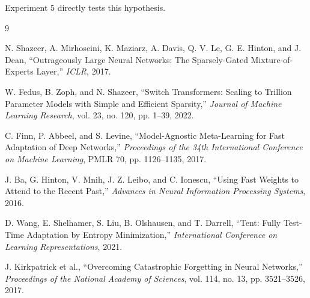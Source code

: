 \documentclass[10pt]{article}
\begin{document}
Experiment 5 directly tests this hypothesis.

\begin{thebibliography}{9}

N. Shazeer, A. Mirhoseini, K. Maziarz, A. Davis, Q. V. Le, G. E. Hinton, and J. Dean,
``Outrageously Large Neural Networks: The Sparsely-Gated Mixture-of-Experts Layer,''
\emph{ICLR}, 2017.

W. Fedus, B. Zoph, and N. Shazeer,
``Switch Transformers: Scaling to Trillion Parameter Models with Simple and Efficient Sparsity,''
\emph{Journal of Machine Learning Research}, vol. 23, no. 120, pp. 1--39, 2022.

C. Finn, P. Abbeel, and S. Levine,
``Model-Agnostic Meta-Learning for Fast Adaptation of Deep Networks,''
\emph{Proceedings of the 34th International Conference on Machine Learning},
PMLR 70, pp. 1126--1135, 2017.

J. Ba, G. Hinton, V. Mnih, J. Z. Leibo, and C. Ionescu,
``Using Fast Weights to Attend to the Recent Past,''
\emph{Advances in Neural Information Processing Systems}, 2016.

D. Wang, E. Shelhamer, S. Liu, B. Olshausen, and T. Darrell,
``Tent: Fully Test-Time Adaptation by Entropy Minimization,''
\emph{International Conference on Learning Representations}, 2021.

J. Kirkpatrick et al.,
``Overcoming Catastrophic Forgetting in Neural Networks,''
\emph{Proceedings of the National Academy of Sciences},
vol. 114, no. 13, pp. 3521--3526, 2017.

\end{thebibliography}
\end{document}
